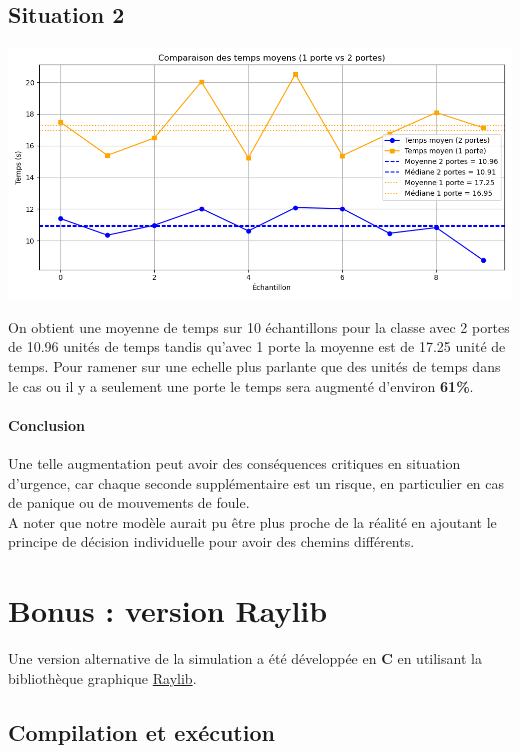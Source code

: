 \documentclass[a4paper,12pt]{article}
\begin{document}
\subsection{Situation 2}


\includegraphics[width=\textwidth]{resultat_2.png} %

On obtient une moyenne de temps sur 10 échantillons pour la classe avec 2 portes de 10.96 unités de temps tandis qu'avec 1 porte la moyenne est de 17.25 unité de temps. Pour ramener sur une echelle plus parlante que des unités de temps dans le cas ou il y a seulement une porte le temps sera augmenté d'environ \textbf{61\%}. 
\paragraph{Conclusion}  Une telle augmentation peut avoir des conséquences critiques en situation d'urgence, car chaque seconde supplémentaire est un risque, en particulier en cas de panique ou de mouvements de foule. \\ \indent A noter que notre modèle aurait pu être plus proche de la réalité en ajoutant le principe de décision individuelle pour avoir des chemins différents.

\section{Bonus : version Raylib}

Une version alternative de la simulation a été développée en \textbf{C} en utilisant la bibliothèque graphique \href{https://www.raylib.com/}{Raylib}.

\subsection{Compilation et exécution}
\end{document}

